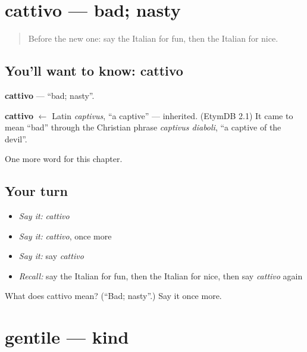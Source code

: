 \section[cattivo]{cattivo — bad; nasty}

\label{lesson:IT-C126-cattivo}



\begin{quote}
Before the new one: say the Italian for fun, then the Italian for nice.
\end{quote}

\subsection*{You'll want to know: cattivo}
\textbf{cattivo} — \textquotedblleft{}bad; nasty\textquotedblright{}.

\begin{cousinweb}
\textbf{cattivo} $\leftarrow$ Latin \emph{captivus}, \textquotedblleft{}a captive\textquotedblright{} — inherited. (EtymDB 2.1) It came to mean \textquotedblleft{}bad\textquotedblright{} through the Christian phrase \emph{captivus diaboli}, \textquotedblleft{}a captive of the devil\textquotedblright{}.
\end{cousinweb}

\begin{grammarlens}[title={What you've built}]
One more word for this chapter.
\end{grammarlens}

\subsection*{Your turn}
\begin{itemize}
\raggedright
  \item \emph{Say it:} \emph{cattivo}
  \item \emph{Say it:} \emph{cattivo}, once more
  \item \emph{Say it:} say \emph{cattivo}
  \item \emph{Recall:} say the Italian for fun, then the Italian for nice, then say \emph{cattivo} again
\end{itemize}

\begin{tcolorbox}[breakable,colback=teal!4,colframe=teal!35!black,title={Before you move on}]
What does cattivo mean? (\textquotedblleft{}Bad; nasty\textquotedblright{}.) Say it once more.
\end{tcolorbox}
\section[gentile]{gentile — kind}

